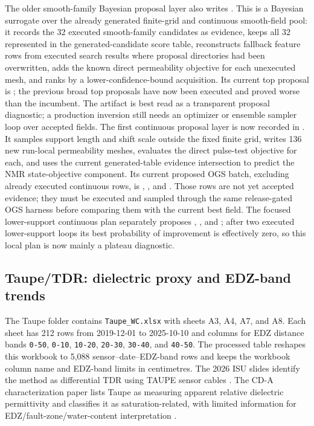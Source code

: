 The older smooth-family Bayesian proposal layer also writes
.  This is a
Bayesian surrogate over the already generated finite-grid and continuous smooth-field
pool: it records the 32 executed smooth-family candidates as evidence, keeps all 32 represented in
the generated-candidate score table, reconstructs fallback feature rows from executed
search results where proposal directories had been overwritten, adds the known direct
permeability objective for each unexecuted mesh, and ranks by a
lower-confidence-bound acquisition.  Its current top proposal is
; the previous broad top proposals have now been
executed and proved worse than the incumbent.  The artifact is best read as a
transparent proposal diagnostic; a production inversion still needs an optimizer or
ensemble sampler loop over accepted fields.
The first continuous proposal layer is now recorded in
.  It
samples support length and shift scale outside the fixed finite grid, writes 136 new
run-local permeability meshes, evaluates the direct pulse-test objective for each,
and uses the current generated-table evidence intersection to predict the NMR
state-objective component.  Its
current proposed OGS batch, excluding already executed continuous rows, is
, , and
.  Those rows are not yet accepted evidence; they must be
executed and sampled through the same release-gated OGS harness before comparing them
with the current  best field.  The focused
lower-support continuous plan separately proposes
, , and
; after two executed lower-support loops its best
probability of improvement is effectively zero, so this local plan is now mainly a
plateau diagnostic.

\subsection{Taupe/TDR: dielectric proxy and EDZ-band trends}

The Taupe folder contains \texttt{Taupe\_WC.xlsx} with sheets A3, A4, A7, and A8.  Each
sheet has 212 rows from 2019-12-01 to 2025-10-10 and columns for EDZ distance bands
\texttt{0-50}, \texttt{0-10}, \texttt{10-20}, \texttt{20-30}, \texttt{30-40}, and
\texttt{40-50}.  The processed  table reshapes this workbook
to 5,088 sensor--date--EDZ-band rows and keeps the workbook column name and EDZ-band
limits in centimetres.  The 2026 ISU slides identify the method as differential TDR
using TAUPE sensor cables \cite[PDF p.~1]{TaupeISU2026Local}.  The CD-A
characterization paper lists Taupe as measuring
apparent relative dielectric permittivity and classifies it as saturation-related,
with limited information for EDZ/fault-zone/water-content interpretation
\cite[PDF pp.~4--5, Tables~1--2]{Ziefle2024Characterization}.


